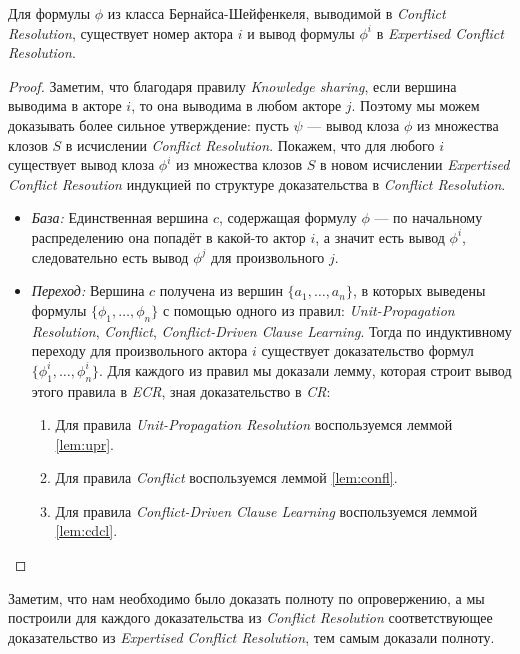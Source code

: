 \begin{theorem}
\label{thm:completeness-bs}
Для формулы $\phi$ из класса Бернайса-Шейфенкеля, выводимой в \emph{Conflict Resolution}, существует номер актора $i$ и вывод формулы $\phi^i$ в \emph{Expertised Conflict Resolution}.
\end{theorem}
\begin{proof}
Заметим, что благодаря правилу \emph{Knowledge sharing}, если вершина выводима в акторе $i$, то она выводима в любом акторе $j$. Поэтому мы можем доказывать более сильное утверждение:
пусть $\psi$ --- вывод клоза $\phi$ из множества клозов $S$ в исчислении \emph{Conflict Resolution}. Покажем, что для любого $i$ существует вывод клоза $\phi^i$ из множества клозов $S$ в новом исчислении \emph{Expertised Conflict Resoution} индукцией по структуре доказательства в \emph{Conflict Resolution}.

\begin{itemize}[label=$\star$] 
\item \emph{База:} Единственная вершина $c$, содержащая формулу $\phi$ --- по начальному распределению она попадёт в какой-то актор $i$, а значит есть вывод $\phi^i$, следовательно есть вывод $\phi^j$ для произвольного $j$.
\item \emph{Переход:} Вершина $c$ получена из вершин $\{a_1, \ldots, a_n\}$, в которых выведены формулы $\{\phi_1, \ldots, \phi_n\}$ с помощью одного из правил: \emph{Unit-Propagation Resolution}, \emph{Conflict}, \emph{Conflict-Driven Clause Learning}. Тогда по индуктивному переходу для произвольного актора $i$ существует доказательство формул $\{\phi_1^i, \ldots, \phi_n^i\}$. Для каждого из правил мы доказали лемму, которая строит вывод этого правила в \emph{ECR}, зная доказательство в \emph{CR}: 
\begin{enumerate}
	\item Для правила \emph{Unit-Propagation Resolution} воспользуемся леммой \ref{lem:upr}.
    \item Для правила \emph{Conflict} воспользуемся леммой \ref{lem:confl}.
    \item Для правила \emph{Conflict-Driven Clause Learning} воспользуемся леммой \ref{lem:cdcl}.
\end{enumerate}
\end{itemize}
\end{proof}

Заметим, что нам необходимо было доказать полноту по опровержению, а мы построили для каждого доказательства из \emph{Conflict Resolution} соответствующее доказательство из \emph{Expertised Conflict Resolution}, тем самым доказали полноту.



